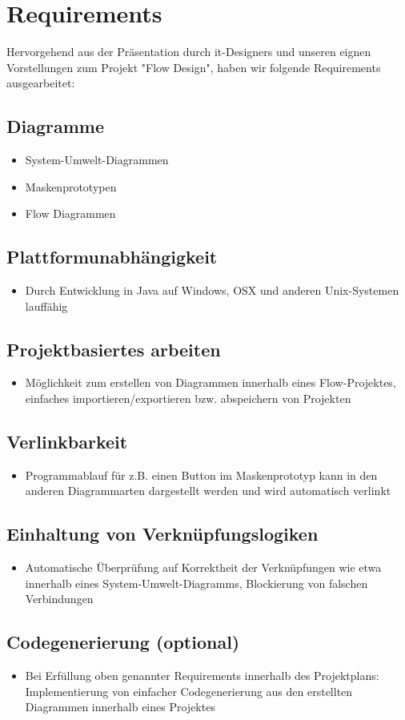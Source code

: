\section{Requirements}
Hervorgehend aus der Präsentation durch it-Designers und unseren eignen Vorstellungen zum Projekt "Flow Design", haben wir folgende Requirements ausgearbeitet:

\subsection{Diagramme}
\begin{itemize}
	\item System-Umwelt-Diagrammen
	\item Maskenprototypen
	\item Flow Diagrammen
\end{itemize}

\subsection{Plattformunabhängigkeit}
\begin{itemize}
	\item Durch Entwicklung in Java auf Windows, OSX und anderen Unix-Systemen lauffähig
\end{itemize}

\subsection{Projektbasiertes arbeiten}
\begin{itemize}
	\item Möglichkeit zum erstellen von Diagrammen innerhalb eines Flow-Projektes, einfaches importieren/exportieren bzw. abspeichern von Projekten
\end{itemize}

\subsection{Verlinkbarkeit}
\begin{itemize}
	\item Programmablauf für z.B. einen Button im Maskenprototyp kann in den anderen Diagrammarten dargestellt werden und wird automatisch verlinkt 
\end{itemize}

\subsection{Einhaltung von Verknüpfungslogiken}
\begin{itemize}
	\item Automatische Überprüfung auf Korrektheit der Verknüpfungen wie etwa innerhalb eines System-Umwelt-Diagramms, Blockierung von falschen Verbindungen  
\end{itemize}

\subsection{Codegenerierung (optional)}
\begin{itemize}
	\item Bei Erfüllung oben genannter Requirements  innerhalb des Projektplans: Implementierung von einfacher Codegenerierung aus den erstellten Diagrammen innerhalb eines Projektes
\end{itemize}
	
	